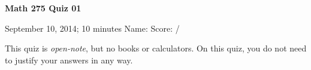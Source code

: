\documentclass[12pt,addpoints]{exam}
\begin{document}
\noindent
\textbf{{\large Math 275 \hfill Quiz 01}} 

\noindent
September 10, 2014; 10 minutes \hfill Name: \underline{\hspace{3in}} \hspace{1em}
Score: \underline{\hspace{0.4in}}/\numpoints

\noindent

\noindent
This quiz is \emph{open-note}, but no books or calculators. On this
quiz, you do not need to justify your answers in any way.

\pointsdroppedatright {}
\pointformat{\hspace{0cm}{\small\fbox{\underline{\hspace{0.8cm}}/\thepoints}}}
\end{document}
